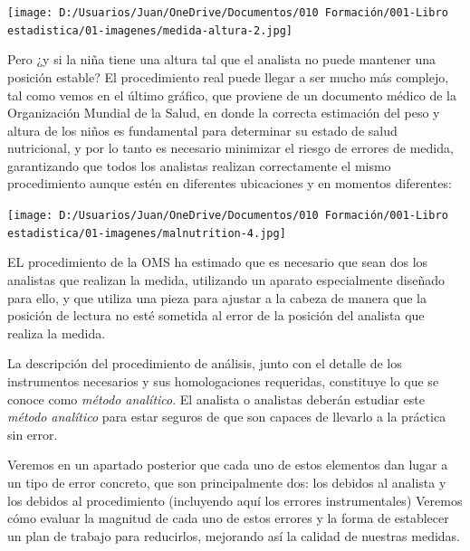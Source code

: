\documentclass[
  letterpaper,
  DIV=11,
  numbers=noendperiod,
  oneside]{scrreprt}
\begin{document}
\begin{marginfigure}

{\centering \texttt{[image: D:/Usuarios/Juan/OneDrive/Documentos/010 Formación/001-Libro estadistica/01-imagenes/medida-altura-2.jpg]}

}

\end{marginfigure}

Pero ¿y si la niña tiene una altura tal que el analista no puede
mantener una posición estable? El procedimiento real puede llegar a ser
mucho más complejo, tal como vemos en el último gráfico, que proviene de
un documento médico de la Organización Mundial de la Salud, en donde la
correcta estimación del peso y altura de los niños es fundamental para
determinar su estado de salud nutricional, y por lo tanto es necesario
minimizar el riesgo de errores de medida, garantizando que todos los
analistas realizan correctamente el mismo procedimiento aunque estén en
diferentes ubicaciones y en momentos diferentes:

\begin{marginfigure}

{\centering \texttt{[image: D:/Usuarios/Juan/OneDrive/Documentos/010 Formación/001-Libro estadistica/01-imagenes/malnutrition-4.jpg]}

}

\end{marginfigure}

EL procedimiento de la OMS ha estimado que es necesario que sean dos los
analistas que realizan la medida, utilizando un aparato especialmente
diseñado para ello, y que utiliza una pieza para ajustar a la cabeza de
manera que la posición de lectura no esté sometida al error de la
posición del analista que realiza la medida.

La descripción del procedimiento de análisis, junto con el detalle de
los instrumentos necesarios y sus homologaciones requeridas, constituye
lo que se conoce como \emph{método analítico}. El analista o analistas
deberán estudiar este \emph{método analítico} para estar seguros de que
son capaces de llevarlo a la práctica sin error.

Veremos en un apartado posterior que cada uno de estos elementos dan
lugar a un tipo de error concreto, que son principalmente dos: los
debidos al analista y los debidos al procedimiento (incluyendo aquí los
errores instrumentales) Veremos cómo evaluar la magnitud de cada uno de
estos errores y la forma de establecer un plan de trabajo para
reducirlos, mejorando así la calidad de nuestras medidas.
\end{document}

